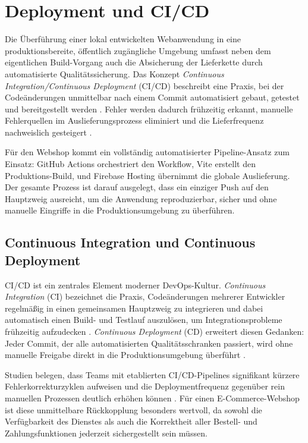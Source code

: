 \chapter{Deployment und CI/CD}
\label{ch:deployment}

Die Überführung einer lokal entwickelten Webanwendung in eine produktionsbereite, öffentlich zugängliche Umgebung umfasst neben dem eigentlichen Build-Vorgang auch die Absicherung der Lieferkette durch automatisierte Qualitätssicherung. Das Konzept \textit{Continuous Integration/Continuous Deployment} (CI/CD) beschreibt eine Praxis, bei der Codeänderungen unmittelbar nach einem Commit automatisiert gebaut, getestet und bereitgestellt werden \cite{jani2023}. Fehler werden dadurch frühzeitig erkannt, manuelle Fehlerquellen im Auslieferungsprozess eliminiert und die Lieferfrequenz nachweislich gesteigert \cite{ugwueze2024}.

Für den Webshop kommt ein vollständig automatisierter Pipeline-Ansatz zum Einsatz: GitHub Actions orchestriert den Workflow, Vite erstellt den Produktions-Build, und Firebase Hosting übernimmt die globale Auslieferung. Der gesamte Prozess ist darauf ausgelegt, dass ein einziger Push auf den Hauptzweig ausreicht, um die Anwendung reproduzierbar, sicher und ohne manuelle Eingriffe in die Produktionsumgebung zu überführen.

\section{Continuous Integration und Continuous Deployment}
\label{sec:cicd-konzept}

CI/CD ist ein zentrales Element moderner DevOps-Kultur. \textit{Continuous Integration} (CI) bezeichnet die Praxis, Codeänderungen mehrerer Entwickler regelmäßig in einen gemeinsamen Hauptzweig zu integrieren und dabei automatisch einen Build- und Testlauf auszulösen, um Integrationsprobleme frühzeitig aufzudecken \cite{makani2022}. \textit{Continuous Deployment} (CD) erweitert diesen Gedanken: Jeder Commit, der alle automatisierten Qualitätsschranken passiert, wird ohne manuelle Freigabe direkt in die Produktionsumgebung überführt \cite{ugwueze2024}.

Studien belegen, dass Teams mit etablierten CI/CD-Pipelines signifikant kürzere Fehlerkorrekturzyklen aufweisen und die Deploymentfrequenz gegenüber rein manuellen Prozessen deutlich erhöhen können \cite{ugwueze2024, patel2025}. Für einen E-Commerce-Webshop ist diese unmittelbare Rückkopplung besonders wertvoll, da sowohl die Verfügbarkeit des Dienstes als auch die Korrektheit aller Bestell- und Zahlungsfunktionen jederzeit sichergestellt sein müssen.

